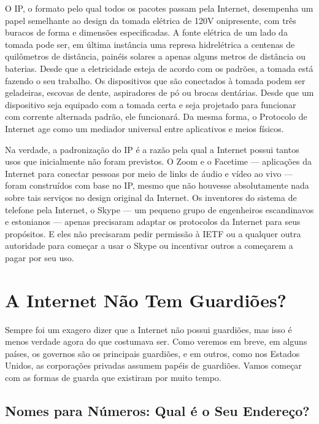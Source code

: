 O IP, o formato pelo qual todos os pacotes passam pela Internet, desempenha um papel
semelhante ao design da tomada elétrica de 120V onipresente, com três buracos de forma e
dimensões especificadas. A fonte elétrica de um lado da tomada pode ser, em última instância
uma represa hidrelétrica a centenas de quilômetros de distância, painéis solares a apenas
alguns metros de distância ou baterias. Desde que a eletricidade esteja de acordo com os
padrões, a tomada está fazendo o seu trabalho. Os dispositivos que são conectados à tomada
podem ser geladeiras, escovas de dente, aspiradores de pó ou brocas dentárias. Desde que um
dispositivo seja equipado com a tomada certa e seja projetado para funcionar com corrente
alternada padrão, ele funcionará. Da mesma forma, o Protocolo de Internet age como um mediador
universal entre aplicativos e meios físicos.

Na verdade, a padronização do IP é a razão pela qual a Internet possui tantos usos que
inicialmente não foram previstos. O Zoom e o Facetime --- aplicações da Internet para
conectar pessoas por meio de links de áudio e vídeo ao vivo --- foram construídos com base
no IP, mesmo que não houvesse absolutamente nada sobre tais serviços no design original da
Internet. Os inventores do sistema de telefone pela Internet, o Skype --- um pequeno grupo de
engenheiros escandinavos e estonianos --- apenas precisaram adaptar os protocolos da Internet
para seus propósitos. E eles não precisaram pedir permissão à IETF ou a qualquer outra
autoridade para começar a usar o Skype ou incentivar outros a começarem a pagar por seu uso.

\section{A Internet Não Tem Guardiões?}
\label{gatekeepers:nao-tem-guardioes}

Sempre foi um exagero dizer que a Internet não possui guardiões, mas isso é menos verdade 
agora do que costumava ser. Como veremos em breve, em alguns países, os governos são os
principais guardiões, e em outros, como nos Estados Unidos, as corporações privadas
assumem papéis de guardiões. Vamos começar com as formas de guarda que existiram por
muito tempo.

\subsection{Nomes para Números: Qual é o Seu Endereço?}
\label{gatekeepers:nomes-para-numeros}

